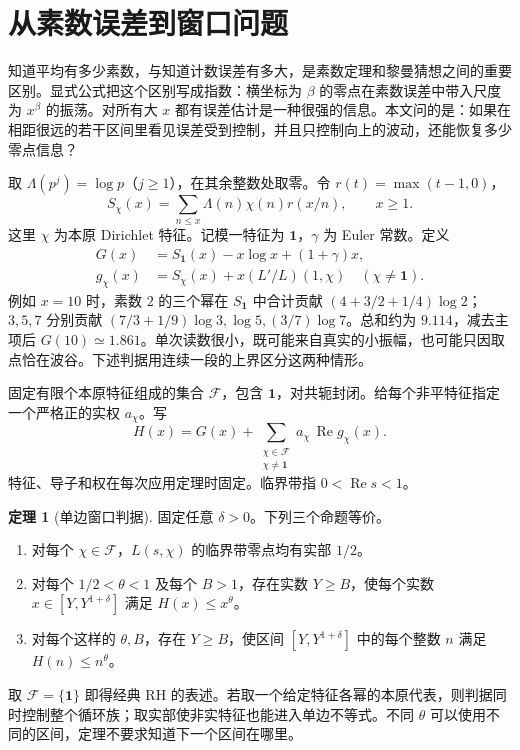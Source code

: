 \documentclass[UTF8,fontset=none,a4paper,11pt]{ctexart}
\theoremstyle{definition}
\newtheorem{thm}{定理}
\newcommand{\re}{\operatorname{Re}}\newcommand{\e}{\varepsilon}
\newcommand{\F}{\mathcal F}\newcommand{\Res}{\operatorname{Res}}
\begin{document}
\section{从素数误差到窗口问题}
知道平均有多少素数，与知道计数误差有多大，是素数定理和黎曼猜想之间的重要区别。显式公式把这个区别写成指数：横坐标为 $\beta$ 的零点在素数误差中带入尺度为 $x^\beta$ 的振荡。对所有大 $x$ 都有误差估计是一种很强的信息。本文问的是：如果在相距很远的若干区间里看见误差受到控制，并且只控制向上的波动，还能恢复多少零点信息？

取 $\Lambda(p^j)=\log p$（$j\ge1$），在其余整数处取零。令 $r(t)=\max(t-1,0)$，
\[
 S_\chi(x)=\sum_{n\le x}\Lambda(n)\chi(n)r(x/n),\qquad x\ge1 .
\]
这里 $\chi$ 为本原 Dirichlet 特征。记模一特征为 $\mathbf1$，$\gamma$ 为 Euler 常数。定义
\begin{align}
 G(x)&=S_{\mathbf1}(x)-x\log x+(1+\gamma)x,\nonumber\\
 g_\chi(x)&=S_\chi(x)+x(L'/L)(1,\chi)\quad(\chi\ne\mathbf1). \label{eq:g}
\end{align}
例如 $x=10$ 时，素数 $2$ 的三个幂在 $S_{\mathbf1}$ 中合计贡献 $(4+3/2+1/4)\log 2$；$3,5,7$ 分别贡献 $(7/3+1/9)\log 3,\log 5,(3/7)\log 7$。总和约为 $9.114$，减去主项后 $G(10)\simeq1.861$。单次读数很小，既可能来自真实的小振幅，也可能只因取点恰在波谷。下述判据用连续一段的上界区分这两种情形。

固定有限个本原特征组成的集合 $\F$，包含 $\mathbf1$，对共轭封闭。给每个非平特征指定一个严格正的实权 $a_\chi$。写
\[
 H(x)=G(x)+\sum_{\substack{\chi\in\F\\\chi\ne\mathbf1}}a_\chi\,\re g_\chi(x).
\]
特征、导子和权在每次应用定理时固定。临界带指 $0<\re s<1$。
\begin{thm}[单边窗口判据]\label{th:main}
固定任意 $\delta>0$。下列三个命题等价。
\begin{enumerate}[label=\textup{(\roman*)}]
\item 对每个 $\chi\in\F$，$L(s,\chi)$ 的临界带零点均有实部 $1/2$。
\item 对每个 $1/2<\theta<1$ 及每个 $B>1$，存在实数 $Y\ge B$，使每个实数 $x\in[Y,Y^{1+\delta}]$ 满足 $H(x)\le x^\theta$。
\item 对每个这样的 $\theta,B$，存在 $Y\ge B$，使区间 $[Y,Y^{1+\delta}]$ 中的每个整数 $n$ 满足 $H(n)\le n^\theta$。
\end{enumerate}
\end{thm}
取 $\F=\{\mathbf1\}$ 即得经典 RH 的表述。若取一个给定特征各幂的本原代表，则判据同时控制整个循环族；取实部使非实特征也能进入单边不等式。不同 $\theta$ 可以使用不同的区间，定理不要求知道下一个区间在哪里。
\end{document}
